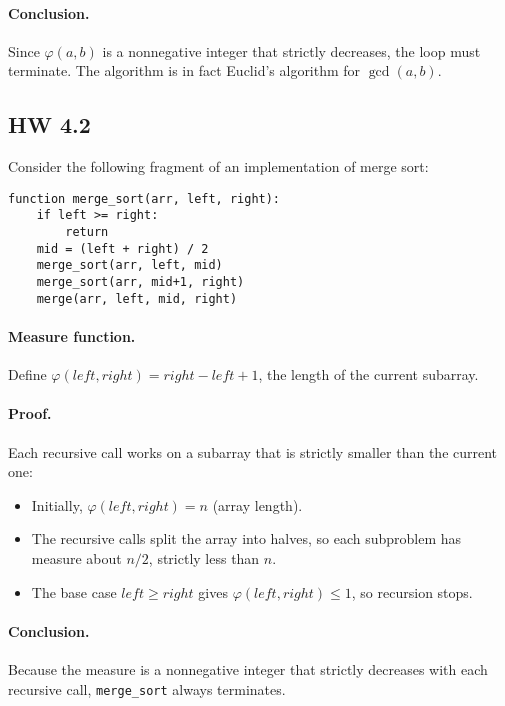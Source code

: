 \documentclass[11pt]{article}
\begin{document}
\paragraph{Conclusion.} Since $\varphi(a,b)$ is a nonnegative integer that strictly decreases, the loop must terminate. The algorithm is in fact Euclid’s algorithm for $\gcd(a,b)$.

\subsection{HW 4.2}
Consider the following fragment of an implementation of merge sort:
\begin{verbatim}
function merge_sort(arr, left, right):
    if left >= right:
        return
    mid = (left + right) / 2
    merge_sort(arr, left, mid)
    merge_sort(arr, mid+1, right)
    merge(arr, left, mid, right)
\end{verbatim}

\paragraph{Measure function.} Define $\varphi(left,right) = right - left + 1$, the length of the current subarray.

\paragraph{Proof.} Each recursive call works on a subarray that is strictly smaller than the current one:
\begin{itemize}
  \item Initially, $\varphi(left,right) = n$ (array length).
  \item The recursive calls split the array into halves, so each subproblem has measure about $n/2$, strictly less than $n$.
  \item The base case $left \geq right$ gives $\varphi(left,right) \leq 1$, so recursion stops.
\end{itemize}

\paragraph{Conclusion.} Because the measure is a nonnegative integer that strictly decreases with each recursive call, \texttt{merge\_sort} always terminates.
\end{document}
